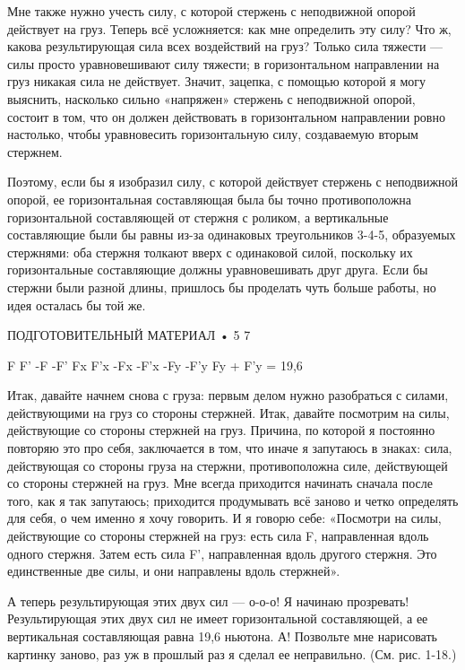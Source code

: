 \documentclass[10pt,oneside]{article}
\begin{document}
Мне также нужно учесть силу, с которой стержень с неподвижной опорой действует на груз. Теперь всё усложняется: как мне определить эту силу? Что ж, какова результирующая сила всех воздействий на груз? Только сила тяжести --- силы просто уравновешивают силу тяжести; в горизонтальном направлении на груз никакая сила не действует. Значит, зацепка, с помощью которой я могу выяснить, насколько сильно «напряжен» стержень с неподвижной опорой, состоит в том, что он должен действовать в горизонтальном направлении ровно настолько, чтобы уравновесить горизонтальную силу, создаваемую вторым стержнем.\par

Поэтому, если бы я изобразил силу, с которой действует стержень с неподвижной опорой, ее горизонтальная составляющая была бы точно противоположна горизонтальной составляющей от стержня с роликом, а вертикальные составляющие были бы равны из-за одинаковых треугольников 3-4-5, образуемых стержнями: оба стержня толкают вверх с одинаковой силой, поскольку их горизонтальные составляющие должны уравновешивать друг друга. Если бы стержни были разной длины, пришлось бы проделать чуть больше работы, но идея осталась бы той же.\par

ПОДГОТОВИТЕЛЬНЫЙ МАТЕРИАЛ • 5 7\par

F F' -F -F' Fx F'x -Fx -F'x -Fy -F'y Fy + F'y = 19,6\par

Итак, давайте начнем снова с груза: первым делом нужно разобраться с силами, действующими на груз со стороны стержней. Итак, давайте посмотрим на силы, действующие со стороны стержней на груз. Причина, по которой я постоянно повторяю это про себя, заключается в том, что иначе я запутаюсь в знаках: сила, действующая со стороны груза на стержни, противоположна силе, действующей со стороны стержней на груз. Мне всегда приходится начинать сначала после того, как я так запутаюсь; приходится продумывать всё заново и четко определять для себя, о чем именно я хочу говорить. И я говорю себе: «Посмотри на силы, действующие со стороны стержней на груз: есть сила F, направленная вдоль одного стержня. Затем есть сила F', направленная вдоль другого стержня. Это единственные две силы, и они направлены вдоль стержней».\par

А теперь результирующая этих двух сил --- о-о-о! Я начинаю прозревать! Результирующая этих двух сил не имеет горизонтальной составляющей, а ее вертикальная составляющая равна 19,6 ньютона. А! Позвольте мне нарисовать картинку заново, раз уж в прошлый раз я сделал ее неправильно. (См. рис. 1-18.)\par
\end{document}
